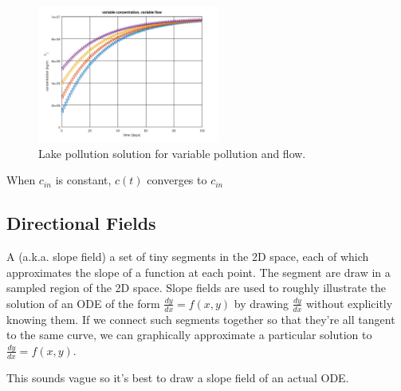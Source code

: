 \documentclass[a4paper]{article}
\begin{document}
\begin{soln}
\begin{multicols}{2}
\columnbreak
\begin{figure}[H]
    \centering
    \includegraphics[height=4.5cm]{img/lake/c_var_f_var.png}
    \caption{Lake pollution solution for variable pollution and flow.}
    \label{fig:my_figure}
\end{figure}
\end{multicols}
When $c_{in}$ is constant, $c(t)$ converges to $c_{in}$
\end{soln}







\subsection{Directional Fields}

A  (a.k.a. slope field) a set of tiny segments in the 2D space, each of which approximates the slope of a function at each point. The segment are draw in a sampled region of the 2D space. Slope fields are used to  roughly illustrate the solution of an ODE of the form $\tfrac{dy}{dx} = f(x,y)$ by drawing $\tfrac{dy}{dx}$ without explicitly knowing them. If we connect such segments together so that they're all tangent to the same curve, we can graphically approximate a particular solution to $\tfrac{dy}{dx} = f(x,y)$. 

This sounds vague so it's best to draw a slope field of an actual ODE. 
\end{document}
